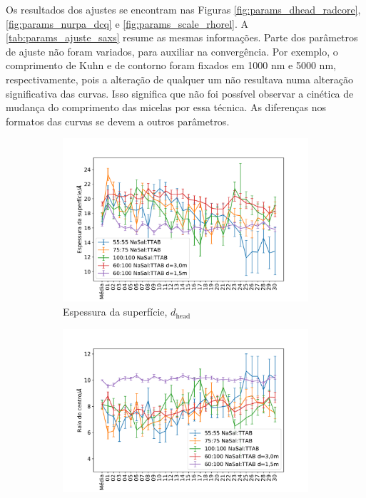 	Os resultados dos ajustes se encontram nas Figuras \ref{fig:params_dhead_radcore}, \ref{fig:params_nurpa_dcq} e \ref{fig:params_scale_rhorel}. A \autoref{tab:params_ajuste_saxs} resume as mesmas informações. Parte dos parâmetros de ajuste não foram variados, para auxiliar na convergência. Por exemplo, o comprimento de Kuhn e de contorno foram fixados em 1000 nm e 5000 nm, respectivamente, pois a alteração de qualquer um não resultava numa alteração significativa das curvas. Isso significa que não foi possível observar a cinética de mudança do comprimento das micelas por essa técnica. As diferenças nos formatos das curvas se devem a outros parâmetros.
			
	\begin{figure}
		\begin{subfigure}[t]{0.5\textwidth}
			\centering
			\includegraphics[width=\textwidth]{imagens/saxs/param_d_head}
			\caption{Espessura da superfície, \(d_{\mathrm{head}}\)}
			\label{fig:param_dhead}
		\end{subfigure} %
		\begin{subfigure}[t]{0.5\textwidth}
			\centering
			\includegraphics[width=\textwidth]{imagens/saxs/param_rad_core}

\end{subfigure}
\end{figure}
